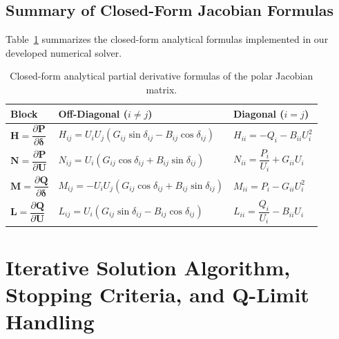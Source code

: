 \documentclass[12pt,a4paper,oneside]{report}
\begin{document}
\subsection{Summary of Closed-Form Jacobian Formulas}
Table~\ref{tab:jacobian_formulas} summarizes the closed-form analytical formulas implemented in our developed numerical solver.

\begin{table}[H]
\centering
\caption{Closed-form analytical partial derivative formulas of the polar Jacobian matrix.}
\label{tab:jacobian_formulas}
\begin{tabular}{lll}
\toprule
\textbf{Block} & \textbf{Off-Diagonal ($i \neq j$)} & \textbf{Diagonal ($i = j$)} \\
\midrule
$\mathbf{H} = \dfrac{\partial \mathbf{P}}{\partial \boldsymbol{\delta}}$ & $H_{ij} = U_i U_j (G_{ij}\sin\delta_{ij} - B_{ij}\cos\delta_{ij})$ & $H_{ii} = -Q_i - B_{ii} U_i^2$ \\[8pt]
$\mathbf{N} = \dfrac{\partial \mathbf{P}}{\partial \mathbf{U}}$ & $N_{ij} = U_i (G_{ij}\cos\delta_{ij} + B_{ij}\sin\delta_{ij})$ & $N_{ii} = \dfrac{P_i}{U_i} + G_{ii} U_i$ \\[8pt]
$\mathbf{M} = \dfrac{\partial \mathbf{Q}}{\partial \boldsymbol{\delta}}$ & $M_{ij} = -U_i U_j (G_{ij}\cos\delta_{ij} + B_{ij}\sin\delta_{ij})$ & $M_{ii} = P_i - G_{ii} U_i^2$ \\[8pt]
$\mathbf{L} = \dfrac{\partial \mathbf{Q}}{\partial \mathbf{U}}$ & $L_{ij} = U_i (G_{ij}\sin\delta_{ij} - B_{ij}\cos\delta_{ij})$ & $L_{ii} = \dfrac{Q_i}{U_i} - B_{ii} U_i$ \\
\bottomrule
\end{tabular}
\end{table}

\section{Iterative Solution Algorithm, Stopping Criteria, and Q-Limit Handling}
\end{document}
